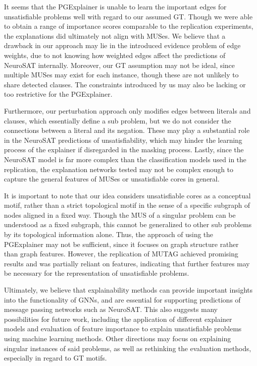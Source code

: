 It seems that the PGExplainer is unable to learn the important edges for unsatisfiable problems well with regard to our assumed GT. Though we were able to obtain a range of importance scores comparable to the replication experiments, the explanations did ultimately not align with MUSes. We believe that a drawback in our approach may lie in the introduced evidence problem of edge weights, due to not knowing how weighted edges affect the predictions of NeuroSAT internally. Moreover, our GT assumption may not be ideal, since multiple MUSes may exist for each instance, though these are not unlikely to share detected clauses. The constraints introduced by us may also be lacking or too restrictive for the PGExplainer.

Furthermore, our perturbation approach only modifies edges between literals and clauses, which essentially define a sub problem, but we do not consider the connections between a literal and its negation. These may play a substantial role in the NeuroSAT predictions of unsatisfiability, which may hinder the learning process of the explainer if disregarded in the masking process. Lastly, since the NeuroSAT model is far more complex than the classification models used in the replication, the explanation networks tested may not be complex enough to capture the general features of MUSes or unsatisfiable cores in general. \bigskip

It is important to note that our idea considers unsatisfiable cores as a conceptual motif, rather than a strict topological motif in the sense of a specific subgraph of nodes aligned in a fixed way. Though the MUS of a singular problem can be understood as a fixed subgraph, this cannot be generalized to other sub problems by its topological information alone. Thus, the approach of using the PGExplainer may not be sufficient, since it focuses on graph structure rather than graph features. However, the replication of MUTAG achieved promising results and was partially reliant on features, indicating that further features may be necessary for the representation of unsatisfiable problems. \bigskip

Ultimately, we believe that explainability methods can provide important insights into the functionality of GNNs, and are essential for supporting predictions of message passing networks such as NeuroSAT. This also suggests many possibilities for future work, including the application of different explainer models and evaluation of feature importance to explain unsatisfiable problems using machine learning methods. Other directions may focus on explaining singular instances of said problems, as well as rethinking the evaluation methods, especially in regard to \ac{GT} motifs.